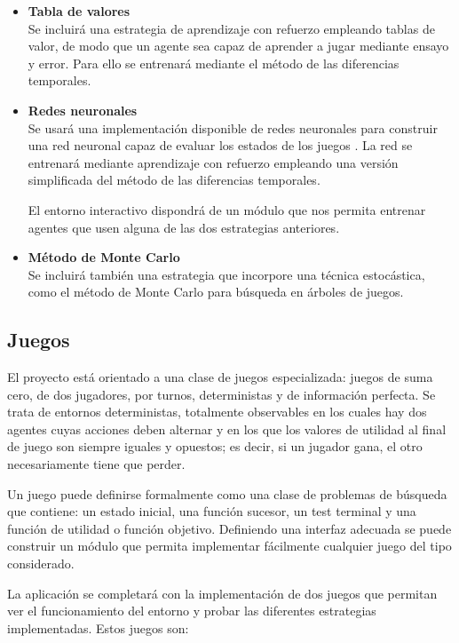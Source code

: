 \documentclass[a4paper,12pt]{article}
\begin{document}
\begin{itemize}
	\item \textbf{Tabla de valores}\\
	Se incluirá una estrategia de aprendizaje con refuerzo empleando tablas de valor, de modo que un agente sea capaz de aprender a jugar mediante ensayo y error.
	Para ello se entrenará mediante el método de las diferencias temporales.
	
	\item \textbf{Redes neuronales}\\
	Se usará una implementación disponible de redes neuronales para construir una red neuronal capaz de evaluar los estados de los juegos \cite{JavaNN}.
	La red se entrenará mediante aprendizaje con refuerzo empleando una versión simplificada del método de las diferencias temporales.
	\par 
	El entorno interactivo dispondrá de un módulo que nos permita entrenar agentes que usen alguna de las dos estrategias anteriores.
	
	\item \textbf{Método de Monte Carlo}\\
	Se incluirá también una estrategia que incorpore una técnica estocástica, como el método de Monte Carlo para búsqueda en árboles de juegos.
	
\end{itemize}

\subsection{Juegos}
\par
El proyecto está orientado a una clase de juegos especializada: juegos de suma cero, de dos jugadores, por turnos, deterministas y de información perfecta.
Se trata de entornos deterministas, totalmente observables en los cuales hay dos agentes cuyas acciones deben alternar y en los que los valores de utilidad al final de juego son siempre iguales y opuestos; es decir, si un jugador gana, el otro necesariamente tiene que perder.

\par 
Un juego puede definirse formalmente como una clase de problemas de búsqueda que contiene: un estado inicial, una función sucesor, un test terminal y una función de utilidad o función objetivo.
Definiendo una interfaz adecuada se puede construir un módulo que permita implementar fácilmente cualquier juego del tipo considerado.

\par 
La aplicación se completará con la implementación de dos juegos que permitan ver el funcionamiento del entorno y probar las diferentes estrategias implementadas.
Estos juegos son:
\end{document}
